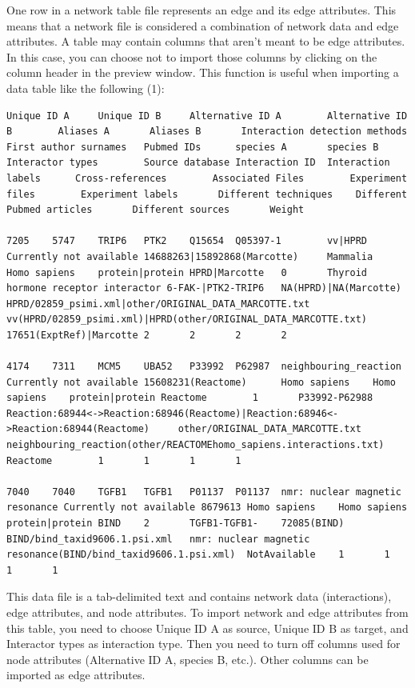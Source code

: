  One row in a network table file represents an edge and its edge attributes. This means that a network file is considered a combination of network data and edge attributes. A table may contain columns that aren't meant to be edge attributes. In this case, you can choose not to import those columns by clicking on the column header in the preview window. This function is useful when importing a data table like the following (1): 
\begin{verbatim}
Unique ID A     Unique ID B     Alternative ID A        Alternative ID B        Aliases A       Aliases B       Interaction detection methods   First author surnames   Pubmed IDs      species A       species B       Interactor types        Source database Interaction ID  Interaction labels      Cross-references        Associated Files        Experiment files        Experiment labels       Different techniques    Different Pubmed articles       Different sources       Weight

7205    5747    TRIP6   PTK2    Q15654  Q05397-1        vv|HPRD Currently not available 14688263|15892868(Marcotte)     Mammalia        Homo sapiens    protein|protein HPRD|Marcotte   0       Thyroid hormone receptor interactor 6-FAK-|PTK2-TRIP6   NA(HPRD)|NA(Marcotte)   HPRD/02859_psimi.xml|other/ORIGINAL_DATA_MARCOTTE.txt   vv(HPRD/02859_psimi.xml)|HPRD(other/ORIGINAL_DATA_MARCOTTE.txt) 17651(ExptRef)|Marcotte 2       2       2       2

4174    7311    MCM5    UBA52   P33992  P62987  neighbouring_reaction   Currently not available 15608231(Reactome)      Homo sapiens    Homo sapiens    protein|protein Reactome        1       P33992-P62988   Reaction:68944<->Reaction:68946(Reactome)|Reaction:68946<->Reaction:68944(Reactome)     other/ORIGINAL_DATA_MARCOTTE.txt        neighbouring_reaction(other/REACTOMEhomo_sapiens.interactions.txt)      Reactome        1       1       1       1

7040    7040    TGFB1   TGFB1   P01137  P01137  nmr: nuclear magnetic resonance Currently not available 8679613 Homo sapiens    Homo sapiens    protein|protein BIND    2       TGFB1-TGFB1-    72085(BIND)     BIND/bind_taxid9606.1.psi.xml   nmr: nuclear magnetic resonance(BIND/bind_taxid9606.1.psi.xml)  NotAvailable    1       1       1       1

\end{verbatim}

 This data file is a tab-delimited text and contains network data (interactions), edge attributes, and node attributes. To import network and edge attributes from this table, you need to choose Unique ID A as source, Unique ID B as target, and Interactor types as interaction type. Then you need to turn off columns used for node attributes (Alternative ID A, species B, etc.). Other columns can be imported as edge attributes. 


